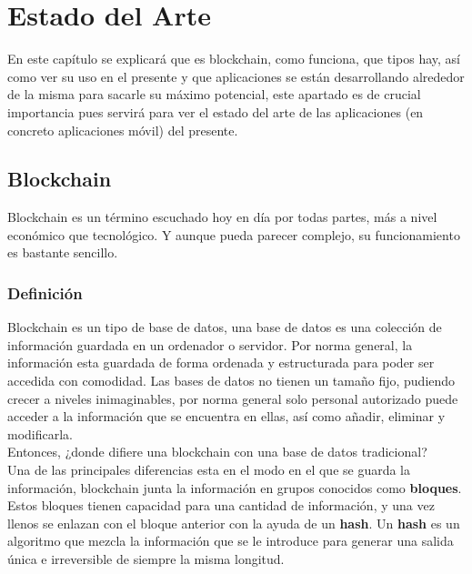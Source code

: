 \chapter{Estado del Arte}
\label{cap:EstadoArte}

\setlength{\parindent}{0pt}

En este capítulo se explicará que es blockchain, como funciona, que tipos hay, así como ver su uso en el presente y que aplicaciones se están desarrollando alrededor de la misma para sacarle su máximo potencial, este apartado es de crucial importancia pues servirá para ver el estado del arte de las aplicaciones (en concreto aplicaciones móvil) del presente.

\section{Blockchain}
Blockchain\cite{b1,b2,b3} es un término escuchado hoy en día por todas partes, más a nivel económico que tecnológico. Y aunque pueda parecer complejo, su funcionamiento es bastante sencillo.

\subsection{Definición}
Blockchain es un tipo de base de datos, una base de datos es una colección de información guardada en un ordenador o servidor. Por norma general, la información esta guardada de forma ordenada y estructurada para poder ser accedida con comodidad. Las bases de datos no tienen un tamaño fijo, pudiendo crecer a niveles inimaginables, por norma general solo personal autorizado puede acceder a la información que se encuentra en ellas, así como añadir, eliminar y modificarla. \\

Entonces, ¿donde difiere una blockchain con una base de datos tradicional? \\

Una de las principales diferencias esta en el modo en el que se guarda la información, blockchain junta la información en grupos conocidos como \textbf{bloques}. Estos bloques tienen capacidad para una cantidad de información, y una vez llenos se enlazan con el bloque anterior con la ayuda de un \textbf{hash}. Un \textbf{hash}\cite{whatIsHash} es un algoritmo que mezcla la información que se le introduce para generar una salida única e irreversible de siempre la misma longitud. \\

